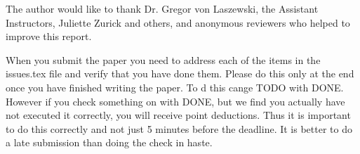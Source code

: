 \documentclass[sigconf]{acmart}
\begin{document}
\begin{acks}

    The author would like to thank Dr. Gregor von Laszewski, 
    the Assistant Instructors, Juliette Zurick and others, and 
    anonymous reviewers who helped to improve this report. 

\end{acks}


 

\appendix

When you submit the paper you need to address each of the items in the
issues.tex file and verify that you have done them. Please do this
only at the end once you have finished writing the paper. To d this
cange TODO with DONE. However if you check something on with DONE, but
we find you actually have not executed it correctly, you will receive
point deductions. Thus it is important to do this correctly and not
just 5 minutes before the deadline. It is better to do a late
submission than doing the check in haste. 


\end{document}
